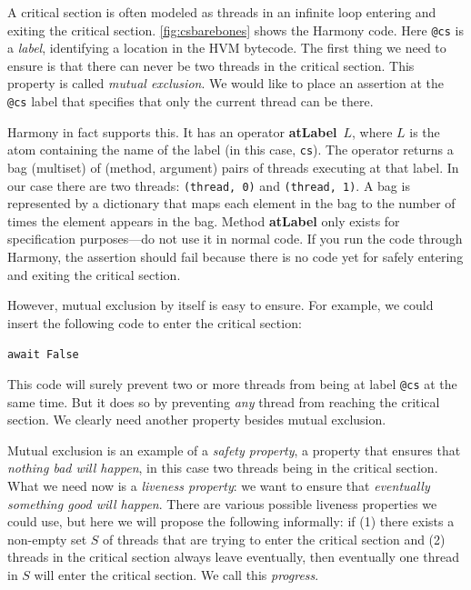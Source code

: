 \documentclass{report}
\newenvironment{code}{
\tcolorbox
}{
\endtcolorbox
}
\begin{document}
%

A critical section is often modeled as threads in an infinite loop
entering and exiting the critical section.
\autoref{fig:csbarebones} shows the Harmony code.
Here \texttt{@cs} is a \emph{label},
%
identifying a location in the HVM bytecode.  The first thing we need to
ensure is that there can never be two threads in the critical section.
This property is called \emph{mutual exclusion}.
%
We would like to place an assertion at the \texttt{@cs} label that
specifies that only the current thread can be there.

Harmony in fact supports this.
It has an operator \textbf{atLabel}~$L$,
%
where $L$
is the atom containing the name of the label (in this case, \texttt{cs}).
The operator returns a bag (multiset) of (method, argument) pairs of threads
executing at that label.
In our case there are two threads: \texttt{(thread, 0)} and \texttt{(thread, 1)}.
A bag is represented by a dictionary that maps each element
in the bag to the number of times the element appears in the bag.
Method \textbf{atLabel} only exists for specification purposes---do not
use it in normal code.
If you run the code through Harmony, the assertion should fail because
there is no code yet for safely entering and exiting the critical section.

However, mutual exclusion by itself is easy to ensure.
For example, we could insert the following code to enter the
critical section:
\begin{code}
\texttt{await False}
\end{code}
This code will surely prevent two or more threads from being
at label \texttt{@cs} at the same time.
But it does so by preventing \emph{any} thread from reaching
the critical section.
We clearly need another property besides mutual exclusion.

Mutual exclusion is an example of a \emph{safety property},
%
a property that ensures that \emph{nothing bad will happen}, in this case
two threads being in the critical section.
What we need now is a \emph{liveness property}:
%
we want to ensure that
\emph{eventually something good will happen}.
There are various possible liveness properties we could use,
but here we will propose the following informally: if
(1) there exists a non-empty
set $S$ of threads that are trying to enter the critical section and
(2) threads in the critical section always leave eventually, then
eventually one thread in $S$ will enter the critical section.
We call this \emph{progress}.
%
\end{document}
